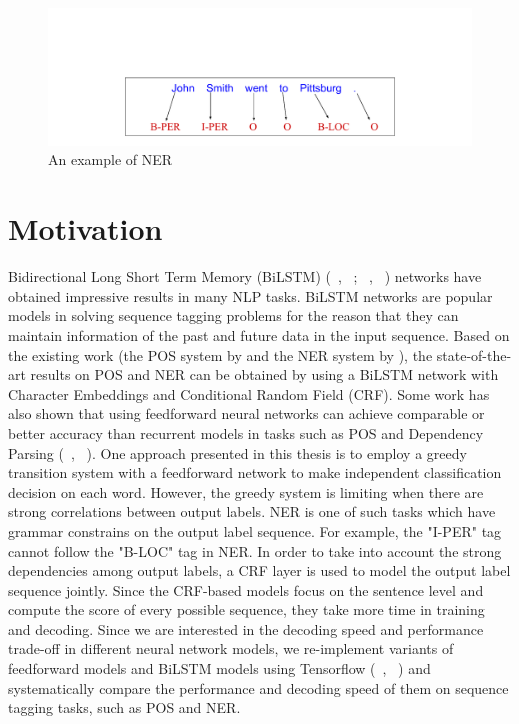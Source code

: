 \documentclass{sfuthesis}
\begin{document}
\begin{figure}
  \centering
  \includegraphics[scale=0.5]{nerex.pdf}
 \caption{An example of NER}
  \label{fig:ner-ex}
\end{figure}

\section{Motivation}

Bidirectional Long Short Term Memory (BiLSTM) (~\citeauthor{Hochreiter97longshort-term}, ~\citeyear{Hochreiter97longshort-term}; ~\citeauthor{graves2005framewise}, ~\citeyear{graves2005framewise}) networks have obtained impressive results in many NLP tasks. BiLSTM networks are popular models in solving sequence tagging problems for the reason that they can maintain information of the past and future data in the input sequence. Based on the existing work (the POS system by \cite{ling2015finding} and the NER system by \cite{lample2016neural}), the state-of-the-art results on POS and NER can be obtained by using a BiLSTM network with Character Embeddings and Conditional Random Field (CRF). Some work has also shown that using feedforward neural networks can achieve comparable or better accuracy than recurrent models in tasks such as POS and Dependency Parsing (~\citeauthor{andor2016globally}, ~\citeyear{andor2016globally}). One approach presented in this thesis is to employ a greedy transition system with a feedforward network to make independent classification decision on each word. However, the greedy system is limiting when there are strong correlations between output labels. NER is one of such tasks which have grammar constrains on the output label sequence. For example, the "I-PER" tag cannot follow the "B-LOC" tag in NER. In order to take into account the strong dependencies among output labels, a CRF layer is used to model the output label sequence jointly. Since the CRF-based models focus on the sentence level and compute the score of every possible sequence, they take more time in training and decoding. Since we are interested in the decoding speed and performance trade-off in different neural network models, we re-implement variants of feedforward models and BiLSTM models using Tensorflow (~\citeauthor{abadi2016tensorflow}, ~\citeyear{abadi2016tensorflow}) and systematically compare the performance and decoding speed of them on sequence tagging tasks, such as POS and NER.
\end{document}
